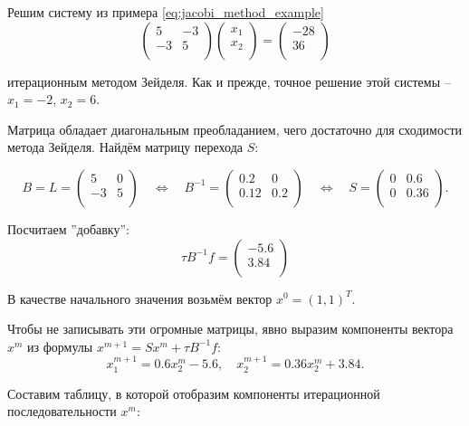 \documentclass{article}
\begin{document}
\begin{example}\label{eq:seidel_method_example}
	Решим систему из примера \eqref{eq:jacobi_method_example}
	\[
		\begin{pmatrix}
			5	& -3 \\
			-3	& 5  \\
		\end{pmatrix}
		\begin{pmatrix}
			x_1 \\
			x_2 \\
		\end{pmatrix}
		=
		\begin{pmatrix}
			-28 \\
			36  \\
		\end{pmatrix}
	\]

	итерационным методом Зейделя. Как и прежде, точное решение этой
	системы -- $x_1=-2$, $x_2=6$.

	Матрица обладает диагональным преобладанием, чего достаточно для
	сходимости метода Зейделя. Найдём матрицу перехода $S$:

	\[
		B=L=
		\begin{pmatrix}
			5	& 0 \\
			-3	& 5  \\
		\end{pmatrix}
		\quad\Leftrightarrow\quad
		B^{-1}=
		\begin{pmatrix}
			0.2	& 0   \\
			0.12	& 0.2 \\
		\end{pmatrix}
		\quad\Leftrightarrow\quad
		S=
		\begin{pmatrix}
			0	& 0.6 \\
			0	& 0.36   \\
		\end{pmatrix}
		.
	\]

	Посчитаем ''добавку'':
	\[\tau B^{-1}f=
		\begin{pmatrix}
			-5.6 \\
			3.84 \\
		\end{pmatrix}
	\]

	В качестве начального значения возьмём вектор $x^0=(1,1)^T$.

	Чтобы не записывать эти огромные матрицы, явно выразим компоненты
	вектора $x^m$ из формулы $x^{m+1}=Sx^m+\tau B^{-1}f$:
	\[x_1^{m+1}=0.6x_2^m-5.6,\quad x_2^{m+1}=0.36x_2^m+3.84.\]

	Составим таблицу, в которой отобразим компоненты итерационной
	последовательности $x^m$:


\end{example}
\end{document}
